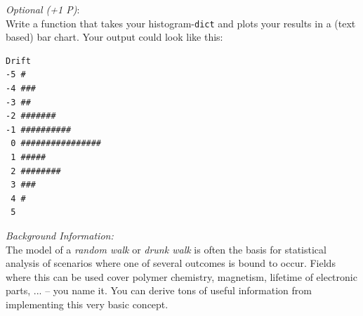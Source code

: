 \documentclass[
	english,
	fontsize=10pt,
	parskip=half,
	titlepage=true,
	DIV=12
]{scrartcl}
\newcommand*{\inPy}[1]{\texttt{#1}}
\begin{document}
\emph{Optional (+1 P)}:\\
Write a function that takes your histogram-\inPy{dict} and plots your results in a (text based) bar chart. 
Your output could look like this:
\begin{verbatim}
Drift
-5 #
-4 ###
-3 ##
-2 #######
-1 ##########
 0 ################
 1 #####
 2 ########
 3 ###
 4 #
 5
\end{verbatim}

\emph{Background Information:}\\
The model of a \emph{random walk} or \emph{drunk walk} is often the basis for statistical analysis of scenarios where one of several outcomes is bound to occur. Fields where this can be used cover polymer chemistry, magnetism, lifetime of electronic parts, ... -- you name it. You can derive tons of useful information from implementing this very basic concept.
\end{document}
